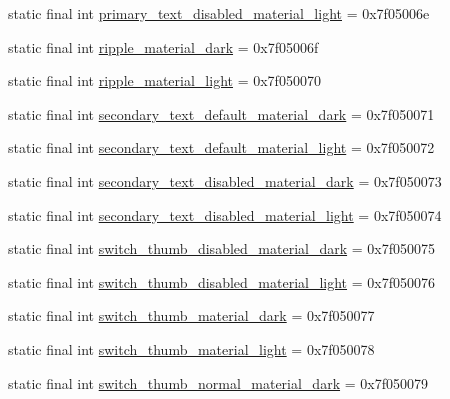 \begin{DoxyCompactItemize}
\item 
static final int \mbox{\hyperlink{classandroid_1_1support_1_1design_1_1R_1_1color_ac0f7294ee1ed3eedd5a3d26e0c77c5f0}{primary\+\_\+text\+\_\+disabled\+\_\+material\+\_\+light}} = 0x7f05006e
\item 
static final int \mbox{\hyperlink{classandroid_1_1support_1_1design_1_1R_1_1color_a485c0ef87a8bd8a5ec8d0a7cb74d0fb3}{ripple\+\_\+material\+\_\+dark}} = 0x7f05006f
\item 
static final int \mbox{\hyperlink{classandroid_1_1support_1_1design_1_1R_1_1color_a587b8e8b3b093ff91615e0ac3120fd70}{ripple\+\_\+material\+\_\+light}} = 0x7f050070
\item 
static final int \mbox{\hyperlink{classandroid_1_1support_1_1design_1_1R_1_1color_a6f174e05ba31135d1c5c92593120f324}{secondary\+\_\+text\+\_\+default\+\_\+material\+\_\+dark}} = 0x7f050071
\item 
static final int \mbox{\hyperlink{classandroid_1_1support_1_1design_1_1R_1_1color_a72180126550e159673be266d96a21b96}{secondary\+\_\+text\+\_\+default\+\_\+material\+\_\+light}} = 0x7f050072
\item 
static final int \mbox{\hyperlink{classandroid_1_1support_1_1design_1_1R_1_1color_a439b5b7bfd6aaf629ee7d085c3e36ea2}{secondary\+\_\+text\+\_\+disabled\+\_\+material\+\_\+dark}} = 0x7f050073
\item 
static final int \mbox{\hyperlink{classandroid_1_1support_1_1design_1_1R_1_1color_ae27cdcff381386cb13c4d0c01c85db0e}{secondary\+\_\+text\+\_\+disabled\+\_\+material\+\_\+light}} = 0x7f050074
\item 
static final int \mbox{\hyperlink{classandroid_1_1support_1_1design_1_1R_1_1color_aa72f26814bf37414e4094fdc0439c85a}{switch\+\_\+thumb\+\_\+disabled\+\_\+material\+\_\+dark}} = 0x7f050075
\item 
static final int \mbox{\hyperlink{classandroid_1_1support_1_1design_1_1R_1_1color_aa7d7ba16921f098226179c0cc9110c0c}{switch\+\_\+thumb\+\_\+disabled\+\_\+material\+\_\+light}} = 0x7f050076
\item 
static final int \mbox{\hyperlink{classandroid_1_1support_1_1design_1_1R_1_1color_aa747920ff464421ba1f1f9c3f78bf414}{switch\+\_\+thumb\+\_\+material\+\_\+dark}} = 0x7f050077
\item 
static final int \mbox{\hyperlink{classandroid_1_1support_1_1design_1_1R_1_1color_a390bb266a32710d89c28dd338a73ef9a}{switch\+\_\+thumb\+\_\+material\+\_\+light}} = 0x7f050078
\item 
static final int \mbox{\hyperlink{classandroid_1_1support_1_1design_1_1R_1_1color_a04cf39f37dbd30293bcf3e7aff284f44}{switch\+\_\+thumb\+\_\+normal\+\_\+material\+\_\+dark}} = 0x7f050079

\end{DoxyCompactItemize}

